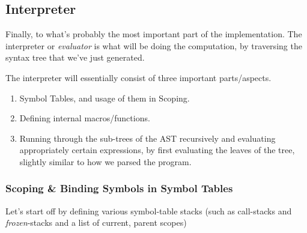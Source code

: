 \documentclass{article}
\begin{document}
  \subsection{Interpreter}
    Finally, to what's probably the most important part of the implementation.
    The interpreter or \emph{evaluator} is what will be doing the computation,
    by traversing the syntax tree that we've just generated.

    The interpreter will essentially consist of three important parts/aspects.
    \begin{enumerate}
      \item Symbol Tables, and usage of them in Scoping.
      \item Defining internal macros/functions.
      \item Running through the sub-trees of the AST recursively and evaluating
      appropriately certain expressions, by first evaluating the leaves of the
      tree, slightly similar to how we parsed the program.
    \end{enumerate}


    \clearpage

    \subsubsection{Scoping \& Binding Symbols in Symbol Tables}
    Let's start off by defining various symbol-table stacks (such as call-stacks
    and \emph{frozen}-stacks and a list of current, parent scopes)
\end{document}

